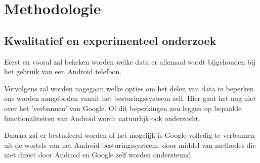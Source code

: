 


\section{Methodologie}
\label{sec:methodologie}


\subsection{{Kwalitatief en experimenteel onderzoek}}


Eerst en vooral zal bekeken worden welke data er allemaal wordt bijgehouden bij het gebruik van een Android telefoon.

\vspace{3mm}

\noindent Vervolgens zal worden nagegaan welke opties om het delen van data te beperken ons worden aangeboden vanuit het besturingssysteem zelf. Hier gaat het nog niet over het 'verbannen' van Google. Of dit beperkingen zou leggen op bepaalde functionaliteiten van Android wordt natuurlijk ook onderzocht.

\vspace{3mm}

\noindent Daarna zal er bestudeerd worden of het mogelijk is Google volledig te verbannen uit de wortels van het Android besturingssysteem, door middel van methodes die niet direct door Android en Google zelf worden ondersteund.

